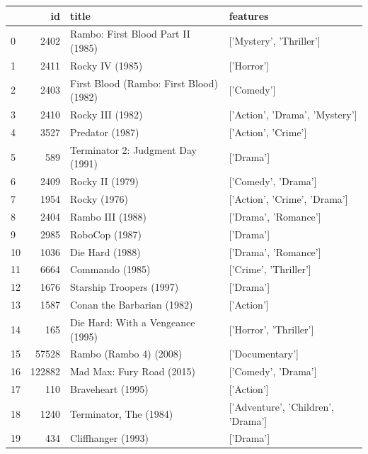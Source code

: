 
\begin{tabular}{lrll}
\toprule
 & id & title & features \\
\midrule
0 & 2402 & Rambo: First Blood Part II (1985) & ['Mystery', 'Thriller'] \\
1 & 2411 & Rocky IV (1985) & ['Horror'] \\
2 & 2403 & First Blood (Rambo: First Blood) (1982) & ['Comedy'] \\
3 & 2410 & Rocky III (1982) & ['Action', 'Drama', 'Mystery'] \\
4 & 3527 & Predator (1987) & ['Action', 'Crime'] \\
5 & 589 & Terminator 2: Judgment Day (1991) & ['Drama'] \\
6 & 2409 & Rocky II (1979) & ['Comedy', 'Drama'] \\
7 & 1954 & Rocky (1976) & ['Action', 'Crime', 'Drama'] \\
8 & 2404 & Rambo III (1988) & ['Drama', 'Romance'] \\
9 & 2985 & RoboCop (1987) & ['Drama'] \\
10 & 1036 & Die Hard (1988) & ['Drama', 'Romance'] \\
11 & 6664 & Commando (1985) & ['Crime', 'Thriller'] \\
12 & 1676 & Starship Troopers (1997) & ['Drama'] \\
13 & 1587 & Conan the Barbarian (1982) & ['Action'] \\
14 & 165 & Die Hard: With a Vengeance (1995) & ['Horror', 'Thriller'] \\
15 & 57528 & Rambo (Rambo 4) (2008) & ['Documentary'] \\
16 & 122882 & Mad Max: Fury Road (2015) & ['Comedy', 'Drama'] \\
17 & 110 & Braveheart (1995) & ['Action'] \\
18 & 1240 & Terminator, The (1984) & ['Adventure', 'Children', 'Drama'] \\
19 & 434 & Cliffhanger (1993) & ['Drama'] \\
\bottomrule
\end{tabular}
